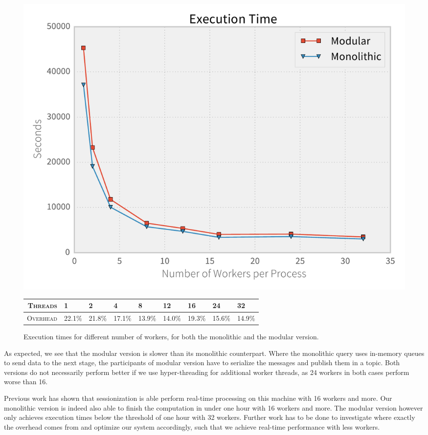 \begin{figure}[htb]
  \centering
    \includegraphics[width=1\textwidth]{figures/evaluation/times}

    {\footnotesize
    \vspace{1em}
    \begin{tabularx}{\textwidth}{ rXXXXXXXX }
      \hline 
      \textsc{Threads} & 1 & 2 & 4 & 8 & 12 & 16 & 24 & 32 \\
      \hline 
      \textsc{Overhead} & 22.1\%&21.8\%&17.1\%&13.9\%&14.0\%&19.3\%&15.6\%&14.9\% \\ %
      \hline
    \end{tabularx}
    }
    \caption[Execution times for different number of workers]{
    Execution times for different number of workers, for both the monolithic
    and the modular version.}
    \label{fig:times}
\end{figure}

As expected, we see that the modular version is slower than its monolithic
counterpart. Where the monolithic query uses in-memory queues to send data
to the next stage, the participants of modular version have to serialize
the messages and publish them in a topic. Both versions do not necessarily
perform better if we use hyper-threading for additional worker threads,
as 24 workers in both cases perform worse than 16.

Previous work has shown that sessionization is able perform real-time processing
on this machine with 16 workers and more. Our monolithic version is indeed also
able to finish the computation in under one hour with 16 workers and more.
The modular version however only achieves execution times below the threshold
of one hour with 32 workers. Further work has to be done to investigate where
exactly the overhead comes from and optimize our system accordingly, such that
we achieve real-time performance with less workers.

